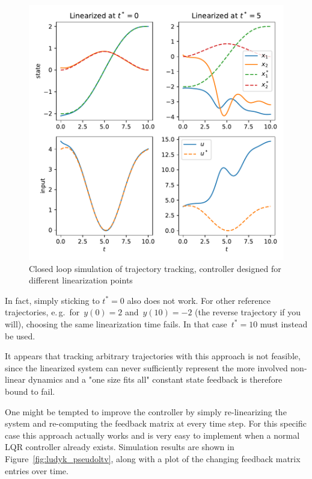 \documentclass[a4paper,11pt,headinclude=true,headsepline,parskip=half,DIV=13]{scrartcl}
\begin{document}
\begin{figure}[ht]
    \centering
    \includegraphics[scale=1]{img/ludyk_lti.pdf}
    \caption{Closed loop simulation of trajectory tracking, controller designed for different linearization points}
    \label{fig:ludyk_lti}
\end{figure}

In fact, simply sticking to $t^*=0$ also does not work.
For other reference trajectories, e.\,g.\ for~$y(0)=2$ and~$y(10)=-2$ (the reverse trajectory if you will), choosing the same linearization time fails.
In that case~$t^*=10$ must instead be used.

It appears that tracking arbitrary trajectories with this approach is not feasible, since the linearized system can never sufficiently represent the more involved non-linear dynamics and a "one size fits all" constant state feedback is therefore bound to fail.

One might be tempted to improve the controller by simply re-linearizing the system and re-computing the feedback matrix at every time step.
For this specific case this approach actually works and is very easy to implement when a normal LQR controller already exists.
Simulation results are shown in Figure~\ref{fig:ludyk_pseudoltv}, along with a plot of the changing feedback matrix entries over time.
\end{document}
